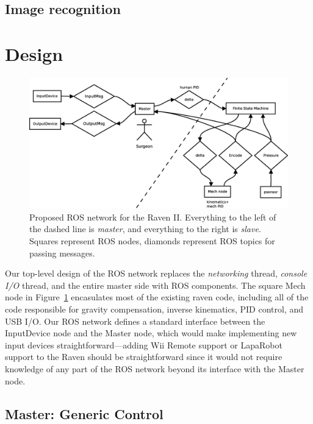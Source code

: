 \documentclass[letterpaper,twocolumn,10pt]{article}
\begin{document}
\subsection{Image recognition}

\section{Design}

\begin{figure}[ht!]
  \begin{center}
    \includegraphics[width=1.0\textwidth]{ros_high_level_v2.eps}
  \end{center}
  \caption{Proposed ROS network for the Raven II. Everything to the
    left of the dashed line is \emph{master}, and everything to the
    right is \emph{slave}. Squares represent ROS nodes, diamonds
    represent ROS topics for passing messages.}
  \label{fig:ros_network}
\end{figure}

Our top-level design of the ROS network replaces the \emph{networking}
thread, \emph{console I/O} thread, and the entire master side with ROS
components. The square Mech node in Figure~\ref{fig:ros_network}
encasulates most of the existing raven code, including all of the code
responsible for gravity compensation, inverse kinematics, PID control,
and USB I/O. Our ROS network defines a standard interface between the
InputDevice node and the Master node, which would make implementing
new input devices straightforward---adding Wii Remote support or
LapaRobot support to the Raven should be straightforward since it
would not require knowledge of any part of the ROS network beyond its
interface with the Master node.

\subsection{Master: Generic Control}
\end{document}
